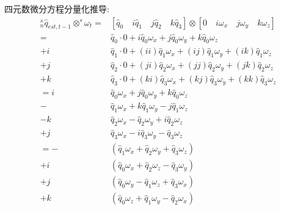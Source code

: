 四元数微分方程分量化推导:
\begin{equation} \label{微分方程分量推导}
    \begin{aligned}
        {^s_n\hat{q}_{est,t-1}}\otimes^s\omega_t
        = &[\hat{q}_0\quad i\hat{q}_1\quad j\hat{q}_2\quad k\hat{q}_3] \otimes [0\quad i\omega_{x}\quad j\omega_{y}\quad k\omega_{z}] \\
        = & \hat{q}_0 \cdot 0 + i    \hat{q}_0 \omega_x + j    \hat{q}_0 \omega_y + k    \hat{q}_0 \omega_z \\
      + i & \hat{q}_1 \cdot 0 + (ii) \hat{q}_1 \omega_x + (ij) \hat{q}_1 \omega_y + (ik) \hat{q}_1 \omega_z \\
      + j & \hat{q}_2 \cdot 0 + (ji) \hat{q}_2 \omega_x + (jj) \hat{q}_2 \omega_y + (jk) \hat{q}_2 \omega_z \\
      + k & \hat{q}_3 \cdot 0 + (ki) \hat{q}_3 \omega_x + (kj) \hat{q}_3 \omega_y + (kk) \hat{q}_3 \omega_z \\
    =   i & \hat{q}_0 \omega_x + j \hat{q}_0 \omega_y + k \hat{q}_0 \omega_z \\
        - & \hat{q}_1 \omega_x + k \hat{q}_1 \omega_y - j \hat{q}_1 \omega_z \\
      - k & \hat{q}_2 \omega_x -   \hat{q}_2 \omega_y + i \hat{q}_2 \omega_z \\
        + j & \hat{q}_3 \omega_x - i \hat{q}_3 \omega_y -   \hat{q}_3 \omega_z \\
        = - & (\hat{q}_1 \omega_x + \hat{q}_2 \omega_y + \hat{q}_3 \omega_z) \\
        + i &(\hat{q}_0 \omega_x + \hat{q}_2 \omega_z - \hat{q}_3 \omega_y) \\
        + j & (\hat{q}_0 \omega_y - \hat{q}_1 \omega_z + \hat{q}_3 \omega_x) \\
        + k & (\hat{q}_0 \omega_z + \hat{q}_1 \omega_y - \hat{q}_2 \omega_x)
    \end{aligned}
\end{equation}

